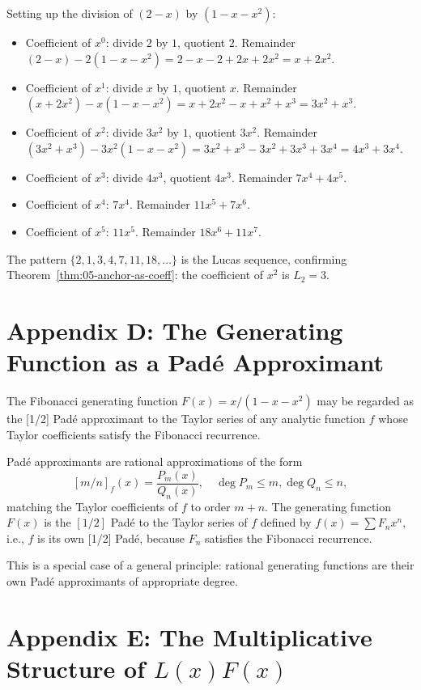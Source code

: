 Setting up the division of $(2 - x)$ by $(1 - x - x^2)$:

\begin{itemize}
  \item Coefficient of $x^0$: divide $2$ by $1$, quotient $2$. Remainder
        $(2 - x) - 2(1 - x - x^2) = 2 - x - 2 + 2x + 2x^2 = x + 2x^2$.
  \item Coefficient of $x^1$: divide $x$ by $1$, quotient $x$. Remainder
        $(x + 2x^2) - x(1 - x - x^2) = x + 2x^2 - x + x^2 + x^3 = 3x^2 + x^3$.
  \item Coefficient of $x^2$: divide $3x^2$ by $1$, quotient $3x^2$.
        Remainder $(3x^2 + x^3) - 3x^2(1 - x - x^2) = 3x^2 + x^3 - 3x^2 + 3x^3 + 3x^4 = 4x^3 + 3x^4$.
  \item Coefficient of $x^3$: divide $4x^3$, quotient $4x^3$. Remainder
        $7x^4 + 4x^5$.
  \item Coefficient of $x^4$: $7x^4$. Remainder $11x^5 + 7x^6$.
  \item Coefficient of $x^5$: $11x^5$. Remainder $18x^6 + 11x^7$.
\end{itemize}

The pattern $\{2, 1, 3, 4, 7, 11, 18, \ldots\}$ is the Lucas sequence,
confirming Theorem~\ref{thm:05-anchor-as-coeff}: the coefficient of $x^2$
is $L_2 = 3$.

\section*{Appendix D: The Generating Function as a Padé Approximant}
\label{sec:05-app-D}

The Fibonacci generating function $F(x) = x/(1-x-x^2)$ may be regarded
as the [1/2] Padé approximant to the Taylor series of any analytic
function $f$ whose Taylor coefficients satisfy the Fibonacci recurrence.

Padé approximants are rational approximations of the form
\[
  [m/n]_f(x) = \frac{P_m(x)}{Q_n(x)}, \quad \deg P_m \le m, \deg Q_n \le n,
\]
matching the Taylor coefficients of $f$ to order $m + n$. The
generating function $F(x)$ is the $[1/2]$ Padé to the Taylor series
of $f$ defined by $f(x) = \sum F_n x^n$, i.e., $f$ is its own [1/2] Padé,
because $F_n$ satisfies the Fibonacci recurrence.

This is a special case of a general principle: rational generating
functions are their own Padé approximants of appropriate degree.

\section*{Appendix E: The Multiplicative Structure of $L(x) F(x)$}
\label{sec:05-app-E}

